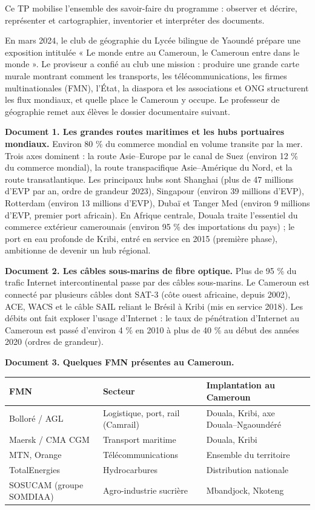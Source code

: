 \documentclass[11pt]{article}
\newcommand{\cle}[1]{{\popxbold\color{popdark}#1}}
\newcounter{popsec}
\newcounter{popsub}
\newcommand{\courssub}[1]{%
  \stepcounter{popsub}%
  \par\vspace{9pt}\noindent{\popxbold\fontsize{11.5}{13}\selectfont\color{popink}{\color{poporange}\thepopsec.\thepopsub}\hspace{6pt}#1}\par\nopagebreak\vspace{4pt}
}
\begin{document}
Ce TP mobilise l'ensemble des savoir-faire du programme : observer et décrire, représenter et cartographier, inventorier et interpréter des documents.

\courssub{Situation}

En mars 2024, le club de géographie du Lycée bilingue de Yaoundé prépare une exposition intitulée « Le monde entre au Cameroun, le Cameroun entre dans le monde ». Le proviseur a confié au club une mission : produire une grande carte murale montrant comment les \cle{transports}, les \cle{télécommunications}, les \cle{firmes multinationales} (FMN), l'\cle{État}, la \cle{diaspora} et les \cle{associations et ONG} structurent les flux mondiaux, et quelle place le Cameroun y occupe. Le professeur de géographie remet aux élèves le dossier documentaire suivant.

\textbf{Document 1. Les grandes routes maritimes et les hubs portuaires mondiaux.} Environ 80 \% du commerce mondial en volume transite par la mer. Trois axes dominent : la route Asie--Europe par le canal de Suez (environ 12 \% du commerce mondial), la route transpacifique Asie--Amérique du Nord, et la route transatlantique. Les principaux hubs sont Shanghai (plus de 47 millions d'EVP par an, ordre de grandeur 2023), Singapour (environ 39 millions d'EVP), Rotterdam (environ 13 millions d'EVP), Dubaï et Tanger Med (environ 9 millions d'EVP, premier port africain). En Afrique centrale, Douala traite l'essentiel du commerce extérieur camerounais (environ 95 \% des importations du pays) ; le port en eau profonde de Kribi, entré en service en 2015 (première phase), ambitionne de devenir un hub régional.

\textbf{Document 2. Les câbles sous-marins de fibre optique.} Plus de 95 \% du trafic Internet intercontinental passe par des câbles sous-marins. Le Cameroun est connecté par plusieurs câbles dont SAT-3 (côte ouest africaine, depuis 2002), ACE, WACS et le câble SAIL reliant le Brésil à Kribi (mis en service 2018). Les débits ont fait exploser l'usage d'Internet : le taux de pénétration d'Internet au Cameroun est passé d'environ 4 \% en 2010 à plus de 40 \% au début des années 2020 (ordres de grandeur).

\textbf{Document 3. Quelques FMN présentes au Cameroun.}

\begin{center}
\begin{tabularx}{\linewidth}{|l|X|X|}\hline
\rowcolor{popblueL} \textbf{FMN} & \textbf{Secteur} & \textbf{Implantation au Cameroun} \\ \hline
Bolloré / AGL & Logistique, port, rail (Camrail) & Douala, Kribi, axe Douala--Ngaoundéré \\ \hline
Maersk / CMA CGM & Transport maritime & Douala, Kribi \\ \hline
MTN, Orange & Télécommunications & Ensemble du territoire \\ \hline
TotalEnergies & Hydrocarbures & Distribution nationale \\ \hline
SOSUCAM (groupe SOMDIAA) & Agro-industrie sucrière & Mbandjock, Nkoteng \\ \hline
\end{tabularx}
\end{center}
\end{document}
